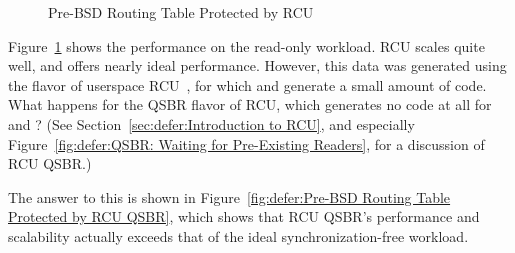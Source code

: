 \begin{figure}[tb]
\centering
{}
\caption{Pre-BSD Routing Table Protected by RCU}
\label{fig:defer:Pre-BSD Routing Table Protected by RCU}
\end{figure}

Figure~\ref{fig:defer:Pre-BSD Routing Table Protected by RCU}
shows the performance on the read-only workload.
RCU scales quite well, and offers nearly ideal performance.
However, this data was generated using the 
flavor of userspace
RCU~\cite{MathieuDesnoyers2009URCU,PaulMcKenney2013LWNURCU},
for which  and 
generate a small amount of code.
What happens for the QSBR flavor of RCU, which generates no code at all
for  and ?
(See Section~\ref{sec:defer:Introduction to RCU},
and especially
Figure~\ref{fig:defer:QSBR: Waiting for Pre-Existing Readers},
for a discussion of RCU QSBR\@.)

The answer to this is shown in
Figure~\ref{fig:defer:Pre-BSD Routing Table Protected by RCU QSBR},
which shows that RCU QSBR's performance and scalability actually exceeds
that of the ideal synchronization-free workload.

